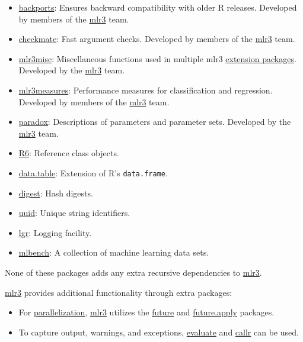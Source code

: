\documentclass[]{article}
\providecommand{\tightlist}{%
  \setlength{\itemsep}{0pt}\setlength{\parskip}{0pt}}
\begin{document}
\begin{itemize}
\tightlist
\item
  \href{https://cran.r-project.org/package=backports}{backports}:
  Ensures backward compatibility with older R releases. Developed by members of the \href{https://mlr3.mlr-org.com}{mlr3} team.
\item
  \href{https://cran.r-project.org/package=checkmate}{checkmate}:
  Fast argument checks. Developed by members of the \href{https://mlr3.mlr-org.com}{mlr3} team.
\item
  \href{https://cran.r-project.org/package=mlr3misc}{mlr3misc}:
  Miscellaneous functions used in multiple mlr3 \href{https://github.com/mlr-org/mlr3/wiki/Extension-Packages}{extension packages}.
  Developed by the \href{https://mlr3.mlr-org.com}{mlr3} team.
\item
  \href{https://cran.r-project.org/package=mlr3measures}{mlr3measures}:
  Performance measures for classification and regression. Developed by members of the \href{https://mlr3.mlr-org.com}{mlr3} team.
\item
  \href{https://cran.r-project.org/package=paradox}{paradox}:
  Descriptions of parameters and parameter sets. Developed by the \href{https://mlr3.mlr-org.com}{mlr3} team.
\item
  \href{https://cran.r-project.org/package=R6}{R6}:
  Reference class objects.
\item
  \href{https://cran.r-project.org/package=data.table}{data.table}:
  Extension of R's \texttt{data.frame}.
\item
  \href{https://cran.r-project.org/package=digest}{digest}:
  Hash digests.
\item
  \href{https://cran.r-project.org/package=uuid}{uuid}:
  Unique string identifiers.
\item
  \href{https://cran.r-project.org/package=lgr}{lgr}:
  Logging facility.
\item
  \href{https://cran.r-project.org/package=mlbench}{mlbench}:
  A collection of machine learning data sets.
\end{itemize}

None of these packages adds any extra recursive dependencies to \href{https://mlr3.mlr-org.com}{mlr3}.

\href{https://mlr3.mlr-org.com}{mlr3} provides additional functionality through extra packages:

\begin{itemize}
\tightlist
\item
  For \protect\hyperlink{parallelization}{parallelization}, \href{https://mlr3.mlr-org.com}{mlr3} utilizes the \href{https://cran.r-project.org/package=future}{future} and \href{https://cran.r-project.org/package=future.apply}{future.apply} packages.
\item
  To capture output, warnings, and exceptions, \href{https://cran.r-project.org/package=evaluate}{evaluate} and \href{https://cran.r-project.org/package=callr}{callr} can be used.
\end{itemize}
\end{document}
